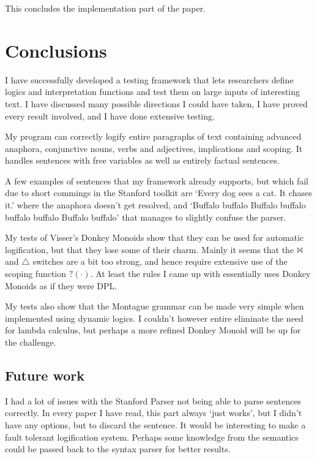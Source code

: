 \documentclass[12pt]{article}
\let\stdsection\section
\renewcommand\section{\newpage\stdsection}
\begin{document}
This concludes the implementation part of the paper.

\section{Conclusions}

I have successfully developed a testing framework that lets researchers define logics and interpretation functions and test them on large inputs of interesting text. I have discussed many possible directions I could have taken, I have proved every result involved, and I have done extensive testing.

My program can correctly logify entire paragraphs of text containing advanced anaphora, conjunctive nouns, verbs and adjectives, implications and scoping. It handles sentences with free variables as well as entirely factual sentences.

A few examples of sentences that my framework already supports, but which fail due to short commings in the Stanford toolkit are `Every dog sees a cat. It chases it.' where the anaphora doesn't get resolved, and `Buffalo buffalo Buffalo buffalo buffalo buffalo Buffalo buffalo' that manages to slightly confuse the parser.

My tests of Visser's Donkey Monoids show that they can be used for automatic logification, but that they lose some of their charm. Mainly it seems that the $\Bowtie$ and $\triangle$ switches are a bit too strong, and hence require extensive use of the scoping function $?(\cdot)$. At least the rules I came up with essentially uses Donkey Monoids as if they were DPL.

My tests also show that the Montague grammar can be made very simple when implemented using dynamic logics. I couldn't however entire eliminate the need for lambda calculus, but perhaps a more refined Donkey Monoid will be up for the challenge.

\subsection{Future work}

I had a lot of issues with the Stanford Parser not being able to parse sentences correctly. In every paper I have read, this part always `just works', but I didn't have any options, but to discard the sentence. It would be interesting to make a fault tolerant logification system. Perhaps some knowledge from the semantics could be passed back to the syntax parser for better results.
\end{document}
